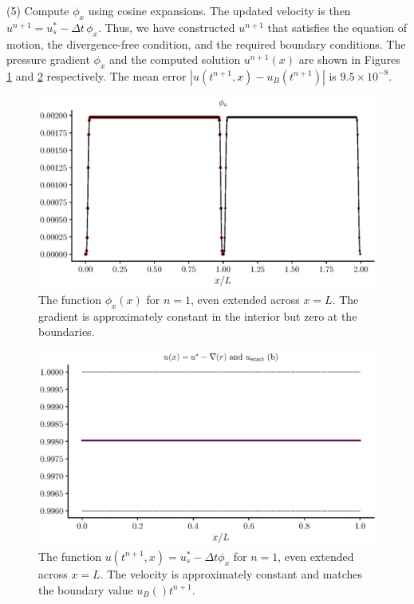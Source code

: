 \documentclass{jfm}
\begin{document}
\noindent(5) Compute $\phi_x$ using cosine expansions. The updated velocity is then $u^{n+1} = u_s^* - \Delta t \, \phi_x$. Thus,
we have constructed $u^{n+1}$ that satisfies the equation of motion, the divergence-free condition, and the required boundary conditions. The pressure gradient $\phi_x$ and the computed solution
$u^{n+1}(x)$ are shown in Figures \ref{fig:pgrad} and \ref{fig:soln1} respectively. The mean error $|u(t^{n+1},x) - u_B(t^{n+1})| $ is $9.5 \times 10^{-8}$.
 \begin{figure}
  \centerline{\includegraphics[width=1.0\textwidth]{FIGS/explicit_1step/pressure_gradient.eps}}
  \caption{The function $\phi_x(x)$ for $n=1$, even extended across $x=L$. The gradient is approximately constant in the interior but zero at the boundaries. }
  \label{fig:pgrad}
\end{figure}
 \begin{figure}
  \centerline{\includegraphics[width=1.0\textwidth]{FIGS/explicit_1step/pressure_correction.eps}}
  \caption{The function $u(t^{n+1},x)=u_s^* - \Delta t \phi_x$ for $n=1$, even extended across $x=L$. The velocity is approximately constant and matches the boundary value $u_B()t^{n+1}$.  }
  \label{fig:soln1}
\end{figure}
\end{document}

